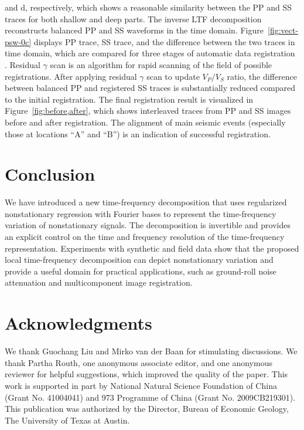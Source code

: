 and d, respectively, which shows a reasonable similarity between the
PP and SS traces for both shallow and deep parts. The inverse LTF
decomposition reconstructs balanced PP and SS 
waveforms in the
time domain. Figure~\ref{fig:vect-psw-0c} displays PP trace, SS trace,
and the difference between the two traces in time domain, which are
compared for three stages of automatic data registration
\cite[]{warp}. Residual $\gamma$ scan is an algorithm for rapid scanning 
of the field of possible registrations. After applying residual
$\gamma$ scan to update $V_P/V_S$ ratio, the difference between
balanced PP and registered SS traces is substantially reduced compared
to the initial registration. The final registration result is
visualized in Figure~\ref{fig:before,after}, which shows interleaved
traces from PP and SS images before and after registration. The
alignment of main seismic events (especially those at locations
``A'' and ``B'') is an indication of successful registration.


 \section{Conclusion} 

We have introduced a new time-frequency
decomposition that uses regularized nonstationary
regression with Fourier bases to represent the time-frequency
variation of nonstationary signals. The
decomposition is invertible and provides an
explicit control on the time and frequency resolution of the
time-frequency representation. Experiments with synthetic and field
data show that the proposed local time-frequency
decomposition can depict nonstationary variation
and provide a useful domain for practical applications, such as
ground-roll noise attenuation and multicomponent image registration.

\section{Acknowledgments}
We thank Guochang Liu and Mirko van der Baan for stimulating
discussions. We thank Partha Routh, one anonymous associate editor,
and one anonymous reviewer for helpful suggestions, which improved the
quality of the paper. This work is supported in part by National
Natural Science Foundation of China (Grant No. 41004041) and 973
Programme of China (Grant No. 2009CB219301). This publication was
authorized by the Director, Bureau of Economic Geology, The University
of Texas at Austin.




%

